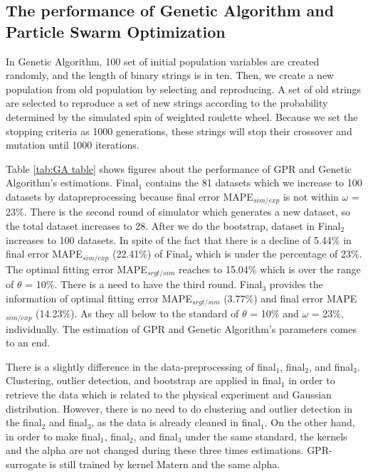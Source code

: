 \subsection{The performance of Genetic Algorithm and Particle Swarm Optimization}
In Genetic Algorithm, 100 set of initial population variables are created randomly, and the length of binary strings is in ten. Then, we create a new population from old population by selecting and reproducing. A set of old strings are selected to reproduce a set of new strings according to the probability determined by the simulated spin of weighted roulette wheel. Because we set the stopping criteria as 1000 generations, these strings will stop their crossover and mutation until 1000 iterations. 

Table \ref{tab:GA table} shows figures about the performance of GPR and Genetic Algorithm's estimations. Final${_1}$ contains the 81 datasets which we increase to 100 datasets by datapreprocessing because final error MAPE$_{sim/exp}$ is not within $\omega$ = 23${\%}$. There is the second round of simulator which generates a new dataset, so the total dataset increases to 28. After we do the bootstrap, dataset in Final${_2}$ increases to 100 datasets. In spite of the fact that there is a decline of 5.44${\%}$ in final error MAPE$_{sim/exp}$ (22.41${\%}$) of Final${_2}$ which is under the percentage of 23${\%}$. The optimal fitting error MAPE$_{srgt/sim}$ reaches to 15.04${\%}$ which is over the range of $\theta$ = 10${\%}$. There is a need to have the third round. Final${_3}$ provides the information of optimal fitting error MAPE$_{srgt/sim}$ (3.77${\%}$) and final error MAPE$_{sim/exp}$ (14.23${\%}$). As they all below to the standard of $\theta$ = 10${\%}$ and $\omega$ = 23${\%}$, individually. The estimation of GPR and Genetic Algorithm's parameters comes to an end.

There is a slightly difference in the data-preprocessing of final${_1}$, final${_2}$, and final${_3}$. Clustering, outlier detection, and bootstrap are applied in final${_1}$ in order to retrieve the data which is related to the physical experiment and Gaussian distribution. However, there is no need to do clustering and outlier detection in the final${_2}$ and final${_3}$, as the data is already cleaned in final${_1}$. On the other hand, in order to make final${_1}$, final${_2}$, and final${_3}$ under the same standard, the kernels and the alpha are not changed during these three times estimations. GPR-surrogate is still trained by kernel Matern and the same alpha.

